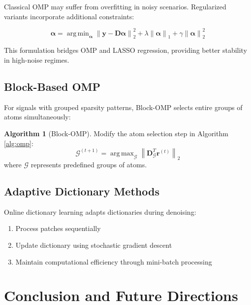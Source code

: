 \documentclass[12pt]{article}
\renewcommand{\vec}[1]{\mathbf{#1}}
\DeclareMathOperator{\argmin}{arg\,min}
\DeclareMathOperator{\argmax}{arg\,max}
\newcommand{\norm}[1]{\left\|#1\right\|}
\theoremstyle{definition}
\newtheorem{algorithm}[theorem]{Algorithm}
\begin{document}
Classical OMP may suffer from overfitting in noisy scenarios. Regularized variants incorporate additional constraints:

\begin{equation}
    \hat{\vec{\alpha}} = \argmin_{\vec{\alpha}} \norm{\vec{y} - \mathbf{D}\vec{\alpha}}_2^2 + \lambda \norm{\vec{\alpha}}_1 + \gamma \norm{\vec{\alpha}}_2^2
\end{equation}

This formulation bridges OMP and LASSO regression, providing better stability in high-noise regimes.

\subsection{Block-Based OMP}
\label{subsec:block_omp}

For signals with grouped sparsity patterns, Block-OMP selects entire groups of atoms simultaneously:

\begin{algorithm}[Block-OMP]
    \label{alg:block_omp}
    Modify the atom selection step in Algorithm \ref{alg:omp}:
    \begin{equation}
        \mathcal{G}^{(t+1)} = \argmax_{\mathcal{G}} \norm{\mathbf{D}_{\mathcal{G}}^T \vec{r}^{(t)}}_2
    \end{equation}
    where $\mathcal{G}$ represents predefined groups of atoms.
\end{algorithm}

\subsection{Adaptive Dictionary Methods}
\label{subsec:adaptive_dict}

Online dictionary learning adapts dictionaries during denoising:

\begin{enumerate}[label=\textbf{\arabic*.}]
    \item Process patches sequentially
    \item Update dictionary using stochastic gradient descent
    \item Maintain computational efficiency through mini-batch processing
\end{enumerate}

\section{Conclusion and Future Directions}
\label{sec:conclusion}
\end{document}
